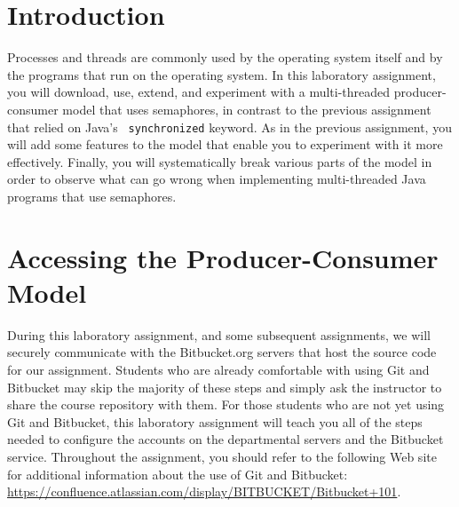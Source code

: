 


\usepackage[compact]{titlesec}


\section*{Introduction}

Processes and threads are commonly used by the operating system itself and by the programs that run on the operating
system.  In this laboratory assignment, you will download, use, extend, and experiment with a multi-threaded
producer-consumer model that uses semaphores, in contrast to the previous assignment that relied on Java's {\tt
  synchronized} keyword.  As in the previous assignment, you will add some features to the model that enable you to
experiment with it more effectively.  Finally, you will systematically break various parts of the model in order to
observe what can go wrong when implementing multi-threaded Java programs that use semaphores.

\section*{Accessing the Producer-Consumer Model}

During this laboratory assignment, and some subsequent assignments, we will securely communicate with the Bitbucket.org
servers that host the source code for our assignment. Students who are already comfortable with using Git and Bitbucket
may skip the majority of these steps and simply ask the instructor to share the course repository with them.  For those
students who are not yet using Git and Bitbucket, this laboratory assignment will teach you all of the steps needed to
configure the accounts on the departmental servers and the Bitbucket service.  Throughout the assignment, you should
refer to the following Web site for additional information about the use of Git and Bitbucket:
\url{https://confluence.atlassian.com/display/BITBUCKET/Bitbucket+101}.  


